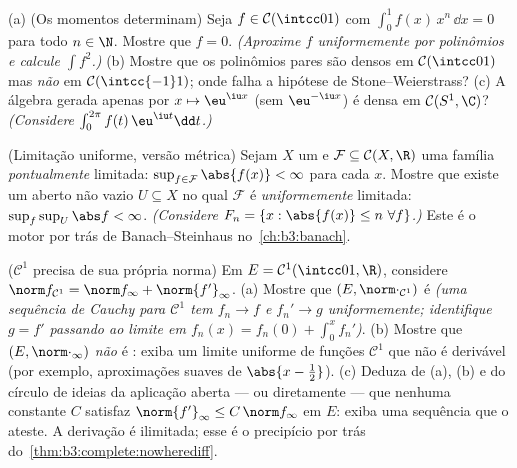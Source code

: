 \begin{exercise}[$\star\star$]\label{exo:b3:complete:9}
(a) (Os momentos determinam) Seja $f \in \mathcal C(\intcc01)$ com $\int_0^1 f(x)\,x^n\,\dd x = 0$ para todo $n \in \N$.
Mostre que $f =
0$. \emph{(Aproxime $f$ uniformemente por
polinômios e calcule $\int f^2$.)}
(b) Mostre que os polinômios pares são densos em $\mathcal
C(\intcc01)$ mas \emph{não} em
$\mathcal C(\intcc{-1}1)$; onde falha a hipótese de Stone--Weierstrass?
(c) A álgebra gerada apenas por $x \mapsto \eu^{\iu x}$ (sem $\eu^{-\iu x}$) é densa em $\mathcal C(S^1, \C)$?
\emph{(Considere $\int_0^{2\pi}f(t)\,\eu^{\iu t}\dd t$.)}
\end{exercise}

\begin{exercise}[$\star\star\star$]\label{exo:b3:complete:10}
(Limitação uniforme, versão métrica) Sejam $X$ um  e $\mathcal F \subseteq \mathcal C(X, \R)$ uma família \emph{pontualmente} limitada: $\sup_{f \in \mathcal
F}\abs{f(x)} < \infty$ para
cada $x$. Mostre que existe um aberto não vazio $U \subseteq X$ no qual $\mathcal F$
é \emph{uniformemente} limitada: $\sup_{f}\sup_U \abs f < \infty$. \emph{(Considere $F_n = \{x : \abs{f(x)} \leq n\ \forall f\}$.)} Este é
o motor por trás de Banach--Steinhaus no~\cref{ch:b3:banach}.
\end{exercise}

\begin{exercise}[$\star\star$]\label{exo:b3:complete:11}
($\mathcal C^1$ precisa de sua própria norma) Em $E = \mathcal
C^1(\intcc01, \R)$, considere $\norm f_{\mathcal C^1} = \norm
f_\infty + \norm{f'}_\infty$.
(a) Mostre que $(E, \norm\cdot_{\mathcal C^1})$ é  \emph{(uma sequência de Cauchy para
$\mathcal C^1$ tem $f_n \to f$ e $f_n' \to g$ uniformemente; identifique $g = f'$ passando
ao limite em $f_n(x) = f_n(0) + \int_0^xf_n'$)}.
(b) Mostre que $(E, \norm\cdot_\infty)$ \emph{não} é : exiba um limite uniforme de
funções $\mathcal C^1$ que não é derivável (por exemplo, aproximações suaves de
$\abs{x - \tfrac12}$).
(c) Deduza de (a), (b) e do círculo de ideias da aplicação aberta ---
ou diretamente --- que nenhuma constante $C$ satisfaz $\norm{f'}_\infty \leq C\,\norm f_\infty$ em
$E$: exiba uma sequência que o ateste. A derivação é ilimitada;
esse é o precipício por trás do~\cref{thm:b3:complete:nowherediff}.
\end{exercise}

